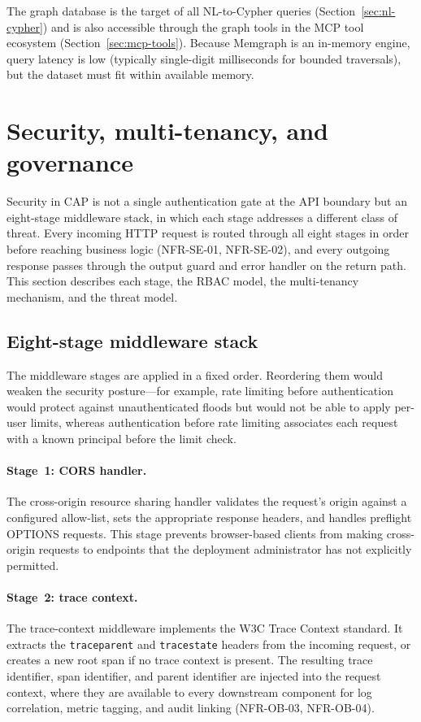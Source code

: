 \documentclass[a4paper]{sapthesis}
\begin{document}
The graph database is the target of all NL-to-Cypher queries
(Section~\ref{sec:nl-cypher}) and is also accessible through the graph
tools in the MCP tool ecosystem (Section~\ref{sec:mcp-tools}).  Because
Memgraph is an in-memory engine, query latency is low (typically
single-digit milliseconds for bounded traversals), but the dataset must
fit within available memory.


\section{Security, multi-tenancy, and governance}
\label{sec:security}

Security in CAP is not a single authentication gate at the API boundary
but an eight-stage middleware stack, in which each stage addresses a
different class of threat.  Every incoming HTTP request is routed through
all eight stages in order before reaching business logic (NFR-SE-01,
NFR-SE-02), and every outgoing response passes through the output guard
and error handler on the return path.  This section describes each stage, the RBAC model, the
multi-tenancy mechanism, and the threat model.

\subsection{Eight-stage middleware stack}

The middleware stages are applied in a fixed order.  Reordering them
would weaken the security posture---for example, rate limiting before
authentication would protect against unauthenticated floods but would
not be able to apply per-user limits, whereas authentication before rate
limiting associates each request with a known principal before the limit
check.

\paragraph{Stage~1: CORS handler.}
The cross-origin resource sharing handler validates the request's origin
against a configured allow-list, sets the appropriate response headers,
and handles preflight OPTIONS requests.  This stage prevents browser-based
clients from making cross-origin requests to endpoints that the deployment
administrator has not explicitly permitted.

\paragraph{Stage~2: trace context.}
The trace-context middleware implements the W3C Trace Context standard.  It
extracts the \texttt{traceparent} and \texttt{tracestate} headers from the
incoming request, or creates a new root span if no trace context is
present.  The resulting trace identifier, span identifier, and parent
identifier are injected into the request context, where they are available
to every downstream component for log correlation, metric tagging, and
audit linking (NFR-OB-03, NFR-OB-04).
\end{document}
